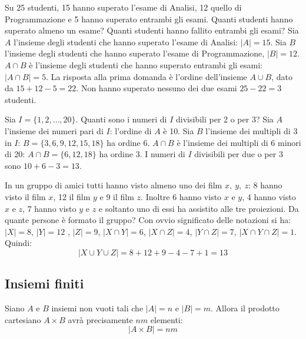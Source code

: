 \begin{example}
	Su 25 studenti, 15 hanno superato l'esame di Analisi, 12 quello di Programmazione e 5 hanno superato entrambi gli esami. Quanti studenti hanno superato almeno un esame? Quanti studenti hanno fallito entrambi gli esami? Sia $A$ l'insieme degli studenti che hanno superato l'esame di Analisi: $|A|=15$. Sia $B$ l'insieme degli studenti che hanno superato l'esame di Programmazione, $|B|=12$. $A \cap B$ è l'insieme degli studenti che hanno superato entrambi gli esami: $|A \cap B|=5$. La risposta alla prima domanda è l'ordine dell'insieme $A \cup B$, dato da $15+12-5=22$. Non hanno superato nessuno dei due esami $25-22=3$ studenti.
\end{example}

\begin{example}
	Sia $I=\{1,2,\ldots,20\}$. Quanti sono i numeri di $I$ divisibili per 2 o per 3? Sia $A$ l'insieme dei numeri pari di $I$: l'ordine di $A$ è 10. Sia $B$ l'insieme dei multipli di 3 in $I$: $B=\{3,6,9,12,15,18\}$ ha ordine 6. $A \cap B$ è l'insieme dei multipli di 6 minori di 20: $A \cap B = \{6,12,18\}$ ha ordine 3. I numeri di $I$ divisibili per due o per 3 sono $10+6-3=13$.
\end{example}

\begin{example}
	In un gruppo di amici  tutti hanno visto almeno uno dei film $x,\ y,\ z$: 8 hanno visto il film $x$, 12 il film $y$ e 9 il film $z$. Inoltre 6 hanno visto $x$ e $y$, 4 hanno visto $x$ e $z$, 7 hanno visto $y$ e $z$ e soltanto uno di essi ha assistito alle tre proiezioni. Da quante persone è formato il gruppo? Con ovvio significato delle notazioni si ha: $\lvert X \rvert = 8$, $\lvert Y \rvert = 12$ , $ \lvert Z \rvert = 9 $, $\vert X \cap Y\vert = 6$, $\vert X \cap Z\vert = 4$, $\vert Y\cap Z\vert = 7$, $\lvert X\cap Y\cap Z\vert = 1$. Quindi:
	\begin{displaymath}
		\lvert X \cup Y \cup Z \rvert = 8+12+9-4-7+1=13
	\end{displaymath}
\end{example}
\subsection{Insiemi finiti}

\begin{propbox}\label{prop:cardinalità_prodotto_Cartesiano}
	Siano $A$ e $B$ insiemi non vuoti tali che $|A|=n$ e $|B|=m$. Allora il prodotto cartesiano $A \times B$ avrà precisamente $nm$ elementi:
	\begin{equation}
		|A \times B| = nm
	\end{equation}
\end{propbox}


